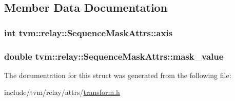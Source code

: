 \subsection{Member Data Documentation}
\subsubsection[{\texorpdfstring{axis}{axis}}]{\setlength{\rightskip}{0pt plus 5cm}int tvm\+::relay\+::\+Sequence\+Mask\+Attrs\+::axis}\hypertarget{structtvm_1_1relay_1_1SequenceMaskAttrs_a7273f14f80b4dbaf455b47d7a2f6ad46}{}\label{structtvm_1_1relay_1_1SequenceMaskAttrs_a7273f14f80b4dbaf455b47d7a2f6ad46}
\subsubsection[{\texorpdfstring{mask\+\_\+value}{mask_value}}]{\setlength{\rightskip}{0pt plus 5cm}double tvm\+::relay\+::\+Sequence\+Mask\+Attrs\+::mask\+\_\+value}\hypertarget{structtvm_1_1relay_1_1SequenceMaskAttrs_a89976b047aa6fa83747077ed0260a5aa}{}\label{structtvm_1_1relay_1_1SequenceMaskAttrs_a89976b047aa6fa83747077ed0260a5aa}


The documentation for this struct was generated from the following file\+:\begin{DoxyCompactItemize}
\item 
include/tvm/relay/attrs/\hyperlink{include_2tvm_2relay_2attrs_2transform_8h}{transform.\+h}\end{DoxyCompactItemize}

